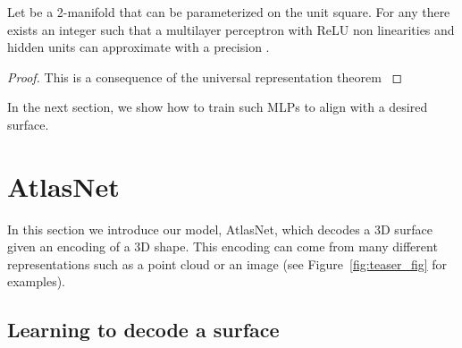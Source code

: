 \documentclass[10pt,twocolumn,letterpaper]{article}
\newcommand{\ournet}{AtlasNet}
\begin{document}
\begin{proposition}
Let  be a 2-manifold that can be parameterized on the unit square. For any  there exists an integer  such that a multilayer perceptron with ReLU non linearities and  hidden units can approximate  with a precision .
\end{proposition}
\vspace*{-13pt}
\begin{proof}
This is a consequence of the universal representation theorem \cite{hornik1991approximation}
\end{proof}
\vspace*{-8pt}

In the next section, we show how to train such MLPs to align with a desired surface. 




































 
\section{\ournet}
\label{sec:implementation}

In this section we introduce our model, \ournet{}, which decodes a 3D surface given an encoding of a 3D shape. This encoding can come from many different representations such as a point cloud or an image (see Figure~\ref{fig:teaser_fig} for examples).





\newcommand{\groundtruth}{\mathcal{S}^\star}
\newcommand{\patchinput}{\mathcal{A}}
\newcommand{\shapefeature}{\mathbf{x}}
\newcommand{\mlp}{\varphi}
\newcommand{\lossmlp}{\mathcal{L}}
\newcommand{\lossatlas}{\mathcal{L}^\prime}
\newcommand{\parameters}{\theta}
\newcommand{\parameterset}{\Theta}


\subsection{Learning to decode a surface}
\end{document}
